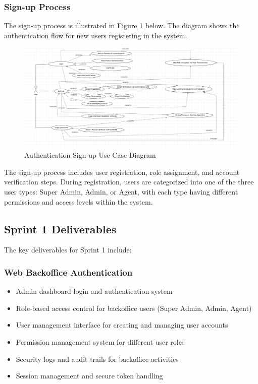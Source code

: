 \subsubsection{Sign-up Process}
The sign-up process is illustrated in Figure \ref{fig:signup-diagram} below. The diagram shows the authentication flow for new users registering in the system.

\begin{figure}[ht!]
    \centering
    \includegraphics[width=1\textwidth]{images/diagram_de_case_d_utilisation_signup.png}
    \caption{Authentication Sign-up Use Case Diagram}
    \label{fig:signup-diagram}
\end{figure}



The sign-up process includes user registration, role assignment, and account verification steps. During registration, users are categorized into one of the three user types: Super Admin, Admin, or Agent, with each type having different permissions and access levels within the system.

\subsection{Sprint 1 Deliverables}
The key deliverables for Sprint 1 include:

\subsubsection{Web Backoffice Authentication}
\begin{itemize}
    \item Admin dashboard login and authentication system
    \item Role-based access control for backoffice users (Super Admin, Admin, Agent)
    \item User management interface for creating and managing user accounts
    \item Permission management system for different user roles
    \item Security logs and audit trails for backoffice activities
    \item Session management and secure token handling
\end{itemize}

